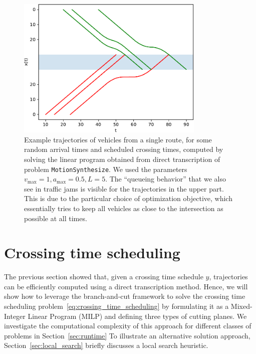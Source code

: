 \documentclass[a4paper]{article}
\theoremstyle{definition}
\theoremstyle{plain}
\begin{document}
\begin{figure}
  \centering
  \includegraphics[width=0.8\textwidth]{figures/single/trajectories_delay.pdf}
  \caption{Example trajectories of vehicles from a single route, for some random
    arrival times and scheduled crossing times, computed by solving the linear
    program obtained from direct transcription of problem \texttt{MotionSynthesize}. We
    used the parameters $v_{\max} = 1, a_{\max} = 0.5, L = 5$. The ``queueing
    behavior'' that we also see in traffic jams is visible for the trajectories
    in the upper part. This is due to the particular choice of optimization
    objective, which essentially tries to keep all vehicles as close to the
    intersection as possible at all times.}
\end{figure}


\section{Crossing time scheduling}
\label{sec:branch-and-cut}

The previous section showed that, given a crossing time schedule $y$,
trajectories can be efficiently computed using a direct transcription method.
Hence, we will show how to leverage the branch-and-cut framework to solve the
crossing time scheduling problem~\eqref{eq:crossing_time_scheduling} by
formulating it as a Mixed-Integer Linear Program (MILP) and defining three types
of cutting planes. We investigate the computational complexity of this approach
for different classes of problems in Section~\ref{sec:runtime} To illustrate an
alternative solution approach, Section~\ref{sec:local_search} briefly discusses
a local search heuristic.
\end{document}
